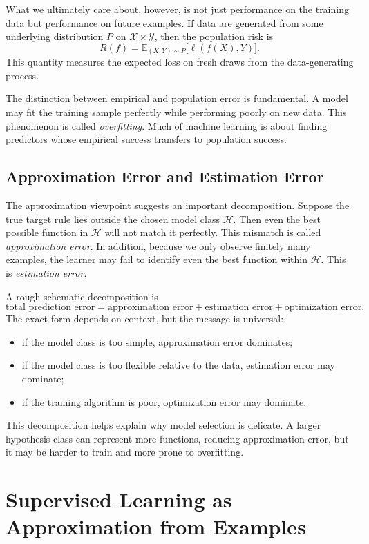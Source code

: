What we ultimately care about, however, is not just performance on the training data but performance on future examples. If data are generated from some underlying distribution $P$ on $\mathcal{X}\times \mathcal{Y}$, then the population risk is
\[
R(f) = \mathbb{E}_{(X,Y)\sim P}\big[\ell(f(X),Y)\big].
\]
This quantity measures the expected loss on fresh draws from the data-generating process.

The distinction between empirical and population error is fundamental. A model may fit the training sample perfectly while performing poorly on new data. This phenomenon is called \emph{overfitting}. Much of machine learning is about finding predictors whose empirical success transfers to population success.

\subsection{Approximation Error and Estimation Error}

The approximation viewpoint suggests an important decomposition. Suppose the true target rule lies outside the chosen model class $\mathcal{H}$. Then even the best possible function in $\mathcal{H}$ will not match it perfectly. This mismatch is called \emph{approximation error}. In addition, because we only observe finitely many examples, the learner may fail to identify even the best function within $\mathcal{H}$. This is \emph{estimation error}.

A rough schematic decomposition is
\[
\text{total prediction error}
=
\text{approximation error}
+
\text{estimation error}
+
\text{optimization error}.
\]
The exact form depends on context, but the message is universal:
\begin{itemize}
    \item if the model class is too simple, approximation error dominates;
    \item if the model class is too flexible relative to the data, estimation error may dominate;
    \item if the training algorithm is poor, optimization error may dominate.
\end{itemize}

This decomposition helps explain why model selection is delicate. A larger hypothesis class can represent more functions, reducing approximation error, but it may be harder to train and more prone to overfitting.

\section{Supervised Learning as Approximation from Examples}

